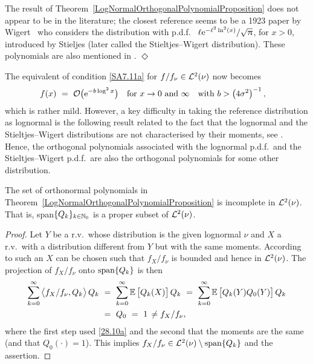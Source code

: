 \begin{remark}\label{Rem:27.10b}
The result of Theorem~\ref{LogNormalOrthogonalPolynomialProposition}
does not appear to be in the literature; the closest reference
seems to be a 1923 paper by Wigert~\cite{Wi23} who considers
the distribution with p.d.f.\
$\ell\mathrm{e}^{-\ell^{2}\ln^{2}(x)}/\sqrt{\uppi}$, for $x>0$, introduced by Stieljes \cite[pp.\ 507--508]{St1894} (later called the Stieltjes--Wigert distribution). These polynomials are also mentioned in \cite[pp.\ 172--175]{Ch11}.
\hfill $\Diamond$ \end{remark}

The equivalent of condition \eqref{SA7.11a} for $f/f_\nu\in\mathcal{L}^2(\nu)$ now becomes
\begin{align}\label{SA7.11c}
f(x)\ &=\ {\mathcal{O}}\big(\mathrm{e}^{-b \log^2x}\big)\quad\text{for }x\to 0 \text{ and } \infty \quad\text{with } b> \big(4\sigma^2\big)^{-1}\,,
\end{align}
which is rather mild. However,
a key difficulty in taking the reference distribution as lognormal is the following
result related to the fact that the lognormal and the Stieltjes--Wigert distributions are not characterised by their moments, see \cite{Heyde63,Berg1984,Ch79,Ch03}. Hence, the orthogonal polynomials associated with the lognormal p.d.f.\ and the Stieltjes--Wigert p.d.f.\ are also the orthogonal polynomials for some other distribution.
\begin{proposition} \label{prop:ln_incomplete} The set of orthonormal polynomials in
Theorem~\ref{LogNormalOrthogonalPolynomialProposition} is incomplete
in $\mathcal{L}^2(\nu)$. That is, {\rm span}$\{Q_k\}_{k \in \mathbb{N}_0}$ is a proper subset of $\mathcal{L}^2(\nu)$.
\end{proposition}
\begin{proof} Let $Y$ be a r.v.\ whose distribution is the given lognormal $\nu$
and $X$ a r.v.\ with a distribution different from $Y$
but with the same moments. According to \cite[pp.\ 201--202]{Berg1984} such an $X$ can be
chosen such that $f_X/f_\nu$ is bounded and hence in $\mathcal{L}^2(\nu)$. The projection of
$f_X/f_\nu$  onto ${\rm span}\{Q_k\}$ is then
\begin{align*}\sum_{k=0}^\infty \left<f_X/f_\nu,Q_k\right>Q_k\ &=\
\sum_{k=0}^\infty \operatorname{{\mathbb E}}\left[Q_k(X)\right]Q_k\ =\ \sum_{k=0}^\infty \operatorname{{\mathbb E}}\left[Q_k(Y) Q_0(Y) \right]Q_k\\
&=\ Q_0\ =\ 1\,\neq f_X/f_\nu,
\end{align*}
where the first step used \eqref{28.10a} and the second that the moments are the same (and that $Q_0(\cdot)=1$).
This implies $f_X/f_\nu\in\mathcal{L}^2(\nu)\setminus{\rm span}\{Q_k\}$ and the assertion.
\end{proof}
%

